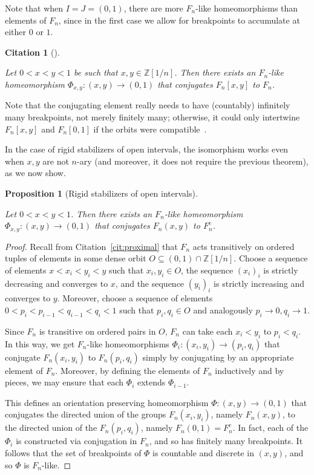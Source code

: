 \documentclass[10pt,a4paper]{article}
\newtheorem{prop}[cdrthm]{Proposition}
\theoremstyle{definition}
\theoremstyle{remark}
\newcommand{\Z}{\mathbb{Z}}
\theoremstyle{plain}
\newtheorem{cit}[cdrthm]{Citation}
\begin{document}
Note that when $I = J = (0, 1)$, there are more $F_n$-like homeomorphisms than elements of $F_n$, since in the first case we allow for breakpoints to accumulate at either $0$ or $1$.

\begin{cit}[{\cite[Theorem E16.7]{bieristrebel}}]
\label{cit:bieristrebel}

Let $0 < x < y < 1$ be such that $x, y \in \Z[1/n]$. Then there exists an $F_n$-like homeomorphism $\Phi_{x, y} \colon (x, y) \to (0, 1)$ that conjugates $F_n[x, y]$ to $F_n$.
\end{cit}

Note that the conjugating element really needs to have (countably) infinitely many breakpoints, not merely finitely many; otherwise, it could only intertwine $F_n[x, y]$ and $F_n[0, 1]$ if the orbits were compatible~\cite{hydelodha}.

In the case of rigid stabilizers of open intervals, the isomorphism works even when $x, y$ are not $n$-ary (and moreover, it does not require the previous theorem), as we now show.

\begin{prop}[Rigid stabilizers of open intervals]
\label{prop:rstab:open}

Let $0 < x < y < 1$. Then there exists an $F_n$-like homeomorphism $\Phi_{x, y} \colon (x, y) \to (0, 1)$ that conjugates $F_n(x, y)$ to $F_n^c$.
\end{prop}

\begin{proof}
Recall from Citation~\ref{cit:proximal} that $F_n$ acts transitively on ordered tuples of elements in some dense orbit $O\subseteq (0,1)\cap \Z[1/n]$. Choose a sequence of elements $x < x_i < y_i < y$ such that $x_i, y_i \in O$, the sequence $(x_i)_i$ is strictly decreasing and converges to $x$, and the sequence $(y_i)_i$ is strictly increasing and converges to $y$. Moreover, choose a sequence of elements $0 < p_i < p_{i-1} < q_{i-1} < q_i < 1$ such that $p_i, q_i \in O$ and analogously $p_i \to 0, q_i \to 1$.

Since $F_n$ is transitive on ordered pairs in $O$, $F_n$ can take each $x_i<y_i$ to $p_i<q_i$. In this way, we get $F_n$-like homeomorphisms $\Phi_i \colon (x_i, y_i) \to (p_i, q_i)$ that conjugate $F_n(x_i, y_i)$ to $F_n(p_i, q_i)$ simply by conjugating by an appropriate element of $F_n$. Moreover, by defining the elements of $F_n$ inductively and by pieces, we may ensure that each $\Phi_i$ extends $\Phi_{i-1}$.

This defines an orientation preserving homeomorphism $\Phi \colon (x, y) \to (0, 1)$ that conjugates the directed union of the groups $F_n(x_i, y_i)$, namely $F_n(x, y)$, to the directed union of the $F_n(p_i, q_i)$, namely $F_n(0, 1) = F_n^c$. In fact, each of the $\Phi_i$ is constructed via conjugation in $F_n$, and so has finitely many breakpoints. It follows that the set of breakpoints of $\Phi$ is countable and discrete in $(x, y)$, and so $\Phi$ is $F_n$-like.
\end{proof}
\end{document}
